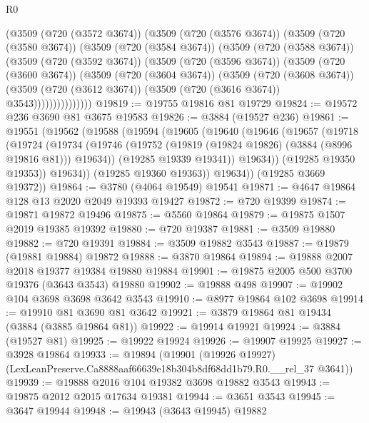 \begin{lexlean}{R0}
\begin{coremodule}
          (@3509
            (@720 (@3572 @3674))
            (@3509
              (@720 (@3576 @3674))
              (@3509
                (@720 (@3580 @3674))
                (@3509
                  (@720 (@3584 @3674))
                  (@3509
                    (@720 (@3588 @3674))
                    (@3509
                      (@720 (@3592 @3674))
                      (@3509
                        (@720 (@3596 @3674))
                        (@3509
                          (@720 (@3600 @3674))
                          (@3509
                            (@720 (@3604 @3674))
                            (@3509
                              (@720 (@3608 @3674))
                              (@3509
                                (@720 (@3612 @3674))
                                (@3509 (@720 (@3616 @3674)) @3543)))))))))))))))
@19819 := @19755 @19816 @81 @19729
@19824 := @19572 @236 @3690 @81 @3675 @19583
@19826 := @3884 (@19527 @236)
@19861 := @19551
    (@19562
      (@19588
        (@19594
          (@19605
            (@19640
              (@19646
                (@19657
                  (@19718
                    (@19724
                      (@19734
                        (@19746 (@19752 (@19819 (@19824 @19826) (@3884 (@8996 @19816 @81))) @19634))
                        (@19285 @19339 @19341))
                      @19634))
                  (@19285 @19350 @19353))
                @19634))
            (@19285 @19360 @19363))
          @19634))
      (@19285 @3669 @19372))
@19864 := @3780 (@4064 @19549) @19541
@19871 := @4647 @19864 @128 @13 @2020 @2049 @19393 @19427
@19872 := @720 @19399
@19874 := @19871 @19872 @19496
@19875 := @5560 @19864
@19879 := @19875 @1507 @2019 @19385 @19392
@19880 := @720 @19387
@19881 := @3509 @19880
@19882 := @720 @19391
@19884 := @3509 @19882 @3543
@19887 := @19879 (@19881 @19884) @19872
@19888 := @3870 @19864
@19894 := @19888 @2007 @2018 @19377 @19384 @19880 @19884
@19901 := @19875 @2005 @500 @3700 @19376 (@3643 @3543) @19880
@19902 := @19888 @498
@19907 := @19902 @104 @3698 @3698 @3642 @3543
@19910 := @8977 @19864 @102 @3698
@19914 := @19910 @81 @3690 @81 @3642
@19921 := @3879 @19864 @81 @19434 (@3884 (@3885 @19864 @81))
@19922 := @19914 @19921
@19924 := @3884 (@19527 @81)
@19925 := @19922 @19924
@19926 := @19907 @19925
@19927 := @3928 @19864
@19933 := @19894
    (@19901 (@19926 @19927) (LexLeanPreserve.Ca8888aaf66639e18b304b8df68dd1b79.R0.__rel_37 @3641))
@19939 := @19888 @2016 @104 @19382 @3698 @19882 @3543
@19943 := @19875 @2012 @2015 @17634 @19381
@19944 := @3651 @3543
@19945 := @3647 @19944
@19948 := @19943 (@3643 @19945) @19882

\end{coremodule}
\end{lexlean}
